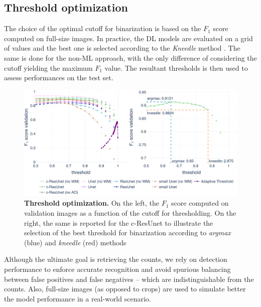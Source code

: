 \subsection{Threshold optimization}

The choice of the optimal cutoff for binarization is based on the $F_1$ score computed on full-size images. In practice, the DL models are evaluated on a grid of values and the best one is selected according to the \textit{Kneedle} method \cite{kneedle}. 
The same is done for the non-ML approach, with the only difference of considering the cutoff yielding the maximum $F_1$ value. 
The resultant thresholds is then used to assess performances on the test set.
\begin{figure}[h]
\centerline{
\includegraphics[width=\textwidth]{figures/130_methods/F1_optimization.pdf}
}
\caption{\textbf{Threshold optimization.} On the left, the $F_{1}$ score computed on validation images as a function of the cutoff for thresholding.
On the right, the same is reported for the c-ResUnet to illustrate the selection of the best threshold for binarization according to \textit{argmax} (blue) and \textit{kneedle} (red) methods
} 
\label{fig:thresh_opt}
\end{figure}
Although the ultimate goal is retrieving the counts, we rely on detection performance to enforce accurate recognition and avoid spurious balancing between false positives and false negatives -- which are indistinguishable from the counts.
Also, full-size images (as opposed to crops) are used to simulate better the model performance in a real-world scenario.

